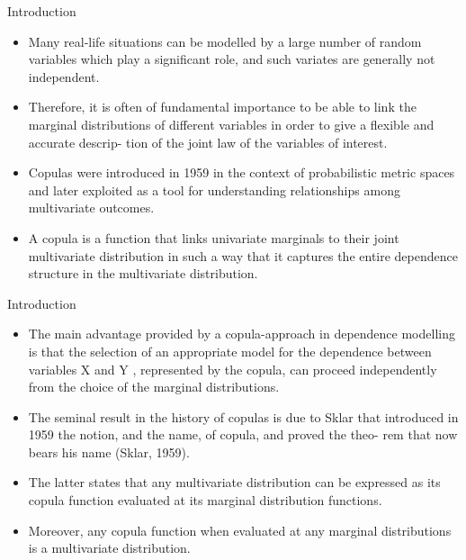 \documentclass[11pt]{beamer}
\theoremstyle{plain}
\theoremstyle{definition}
\theoremstyle{remark}
\begin{document}
%
\begin{frame}{Introduction}
   \begin{itemize}
      	\item  Many real-life situations can be modelled by a large number of random variables which play a significant role, and such 
      	variates are generally not independent. 
		\item Therefore, it is often of fundamental importance to be able to link the marginal distributions of different variables in order 
		to give a flexible and accurate descrip- tion of the joint law of the variables of interest. 	
		\item Copulas were introduced in 1959 in the context of probabilistic metric spaces and later exploited as a tool for 
		understanding relationships among multivariate outcomes. 
		\item A copula is a function that links univariate marginals to their joint multivariate distribution in such a way that it captures 
		the entire dependence structure in the multivariate distribution. 
   \end{itemize}
\end{frame}
%
\begin{frame}{Introduction}
   \begin{itemize}
		\item The main advantage provided by a copula-approach in dependence modelling is that the selection of an appropriate model 
		for the dependence between variables X and Y , represented by the copula, can proceed independently from the choice of the 
		marginal distributions. 
		\item The seminal result in the history of copulas is due to Sklar that introduced in 1959 the notion, and the name, of copula, 
		and proved the theo- rem that now bears his name (Sklar, 1959). 
		\item The latter states that any multivariate distribution can be expressed as its copula function evaluated at its marginal 
		distribution functions. 
		\item Moreover, any copula function when evaluated at any marginal distributions is a multivariate distribution.
   \end{itemize}
\end{frame}
\end{document}
